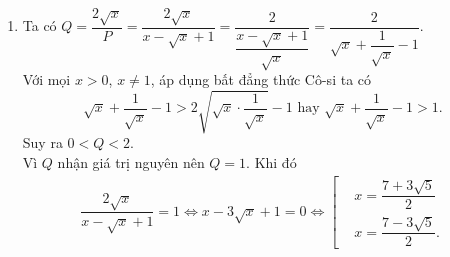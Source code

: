 \begin{bt}
{\begin{enumerate}
			\item Ta có $Q = \dfrac{2\sqrt{x}}{P} = \dfrac{2\sqrt{x}}{x-\sqrt{x}+1} = \dfrac{2}{\dfrac{x-\sqrt{x}+1}{\sqrt{x}}} = \dfrac{2}{\sqrt{x}+\dfrac{1}{\sqrt{x}}-1}$.\\
			Với mọi $x>0$, $x \neq 1$, áp dụng bất đẳng thức Cô-si ta có $$\sqrt{x}+\dfrac{1}{\sqrt{x}}-1 > 2\sqrt{\sqrt{x}\cdot \dfrac{1}{\sqrt{x}}}-1 \text{ hay } \sqrt{x}+\dfrac{1}{\sqrt{x}}-1>1.$$
			Suy ra $0<Q<2$.\\
			Vì $Q$ nhận giá trị nguyên nên $Q=1$. Khi đó
			\allowdisplaybreaks
			\begin{eqnarray*}
				\dfrac{2\sqrt{x}}{x-\sqrt{x}+1}=1 \Leftrightarrow x-3\sqrt{x}+1=0 \Leftrightarrow \left[\begin{aligned}&x=\dfrac{7+3\sqrt{5}}{2} \\&x=\dfrac{7-3\sqrt{5}}{2}.\end{aligned}\right.
			\end{eqnarray*}
		\end{enumerate}
	}
\end{bt}

